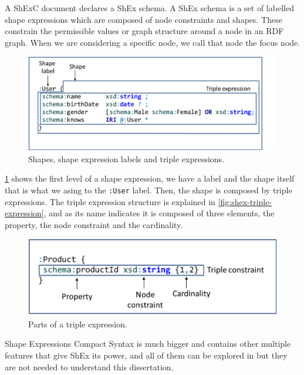 A ShExC document declares a ShEx schema. A ShEx schema is a set of labelled shape expressions which are composed
of node constraints and shapes. These constrain the permissible values or graph structure around a node in an RDF
graph. When we are considering a specific node, we call that node the focus node.

\begin{figure}
  \includegraphics[scale=0.25]{images/shex-out.png}
  \centering
  \caption[Shapes, shape expression labels and triple expressions]{Shapes, shape expression labels and triple expressions.}
  \label{fig:shex-out-view}
\end{figure}

\cref{fig:shex-out-view} shows the first level of a shape expression, we have a label and the shape itself that is
what we asing to the \texttt{:User} label. Then, the shape is composed by triple expressions. The triple expression
structure is explained in \cref{fig:shex-triple-expression}, and as its name indicates it is composed of three
elements, the property, the node constraint and the cardinality.

\begin{figure}
  \includegraphics[scale=0.25]{images/shex-triple-expression.png}
  \centering
  \caption[Parts of a triple expression]{Parts of a triple expression.}
  \label{shex-triple-expression}
\end{figure}

Shape Expressions Compact Syntax is much bigger and contains other multiple features that give ShEx its power,
and all of them can be explored in \cite{labra-validating-rdf} but they are not needed to understand this
dissertation.

